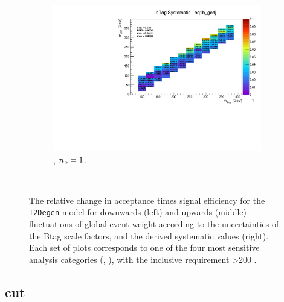\begin{figure}[ht!]
\begin{subfigure}[b]{0.32\textwidth}
    \includegraphics[width=\textwidth, page=1]{Figs/sms/t2degen/v19/systs/T2_4body_bTag_eq1b_ge4j.pdf}
    \caption{\njhigh, $n_{\text{b}} = 1$.}
  \end{subfigure}\\
  \caption{The relative change in acceptance times signal efficiency for the
  \texttt{T2Degen} model for downwards (left) and upwards (middle) fluctuations
  of global event weight according to the uncertainties of the Btag scale 
  factors,
  and the derived systematic values (right). Each set of plots corresponds
  to one of the four most sensitive analysis categories (\nb, \nj), with the
  inclusive requirement \HT>200 \gev.}
  \label{fig:sms-btag-t2degen}
\end{figure}


\newpage
\subsection*{\mhtmet cut}
\label{sec:t2degen_mhtmet_plots}

